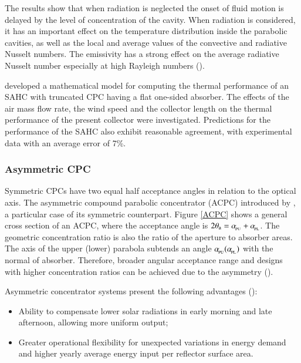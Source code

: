 The results show that when radiation is neglected the onset of fluid motion is delayed by the level of concentration of the cavity. When radiation is considered, it has an important effect on the temperature distribution inside the parabolic cavities, as well as the local and average values of the convective and radiative Nusselt numbers. The emissivity has a strong effect on the average radiative Nusselt number especially at high Rayleigh numbers (\cite{Diaz2008}).

\citet{Tchinda2008} developed a mathematical model for computing the thermal performance of an SAHC with truncated CPC having a flat one-sided absorber. The effects of the air mass flow rate, the wind speed and the collector length on the thermal performance of the present collector were investigated. Predictions for the performance of the SAHC also exhibit reasonable agreement, with experimental data with an average error of 7\%.

\subsubsection{Asymmetric CPC}

Symmetric CPCs have two equal half acceptance angles in relation to the optical axis. The asymmetric compound parabolic concentrator (ACPC) introduced by \citet{Rabl1976}, a particular case of its symmetric counterpart. Figure \ref{ACPC} shows a general cross section of an ACPC, where the acceptance angle is $\rm{2\theta_a = \alpha_{\!_{PU}} + \alpha_{\!_{PL}}}$. The geometric concentration ratio is also the ratio of the aperture to absorber areas. The axis of the upper (lower) parabola subtends an angle $\rm{\alpha_{\!_{PU}} (\alpha_{\!_{PL}})}$ with the normal of absorber. Therefore, broader angular acceptance range and designs with higher concentration ratios can be achieved due to the asymmetry (\cite{Tian2018}). 


Asymmetric concentrator systems present the following advantages (\cite{Mills1978}):

\begin{itemize}
	\item Ability to compensate lower solar radiations in early morning and late afternoon, allowing more uniform output;
	\item Greater operational flexibility for unexpected variations in energy demand and higher yearly average energy input per reflector surface area.
\end{itemize}

